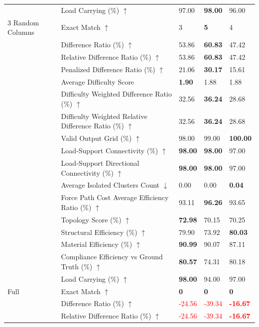 \begin{table}[!h]
{\begin{tabular}{lllll}
 & Load Carrying (\%) $\uparrow$ & 97.00 & \textbf{98.00} & 96.00 \\
3 Random Columns & Exact Match $\uparrow$ & 3 & \textbf{5} & 4 \\
 & Difference Ratio (\%) $\uparrow$ & 53.86 & \textbf{60.83} & 47.42 \\
 & Relative Difference Ratio (\%) $\uparrow$ & 53.86 & \textbf{60.83} & 47.42 \\
 & Penalized Difference Ratio (\%) $\uparrow$ & 21.06 & \textbf{30.17} & 15.61 \\
 & Average Difficulty Score & \textbf{1.90} & 1.88 & 1.88 \\
 & Difficulty Weighted Difference Ratio (\%) $\uparrow$ & 32.56 & \textbf{36.24} & 28.68 \\
 & Difficulty Weighted Relative Difference Ratio (\%) $\uparrow$ & 32.56 & \textbf{36.24} & 28.68 \\
 & Valid Output Grid (\%) $\uparrow$ & 98.00 & 99.00 & \textbf{100.00} \\
 & Load-Support Connectivity (\%) $\uparrow$ & \textbf{98.00} & \textbf{98.00} & 97.00 \\
 & Load-Support Directional Connectivity (\%) $\uparrow$ & \textbf{98.00} & \textbf{98.00} & 97.00 \\
 & Average Isolated Clusters Count $\downarrow$ & 0.00 & 0.00 & \textbf{0.04} \\
 & Force Path Cost Average Efficiency Ratio (\%) $\uparrow$ & 93.11 & \textbf{96.26} & 93.65 \\
 & Topology Score (\%) $\uparrow$ & \textbf{72.98} & 70.15 & 70.25 \\
 & Structural Efficiency (\%) $\uparrow$ & 79.90 & 73.92 & \textbf{80.03} \\
 & Material Efficiency (\%) $\uparrow$ & \textbf{90.99} & 90.07 & 87.11 \\
 & Compliance Efficiency vs Ground Truth (\%) $\uparrow$ & \textbf{80.57} & 74.31 & 80.18 \\
 & Load Carrying (\%) $\uparrow$ & \textbf{98.00} & 94.00 & 97.00 \\
Full & Exact Match $\uparrow$ & \textbf{0} & \textbf{0} & \textbf{0} \\
 & Difference Ratio (\%) $\uparrow$ & \textcolor{red}{-24.56} & \textcolor{red}{-39.34} & \textbf{\textcolor{red}{-16.67}} \\
 & Relative Difference Ratio (\%) $\uparrow$ & \textcolor{red}{-24.56} & \textcolor{red}{-39.34} & \textbf{\textcolor{red}{-16.67}} \\

\end{tabular}}
\end{table}

